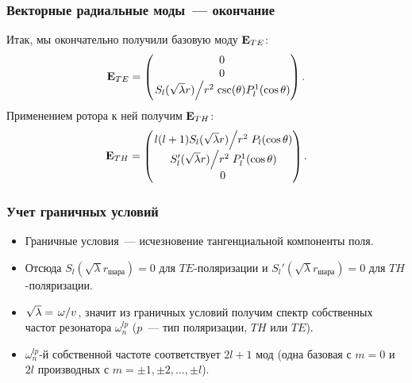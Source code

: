 \documentclass[compress]{beamer}
\begin{document}
    \begin{frame}\frametitle{Векторные радиальные моды~--- окончание}

        Итак, мы окончательно получили базовую моду $\vb{E}_{TE}$:
        \begin{equation*}
            \vb{E}_{TE} = \begin{pmatrix}
                0 \\ 0 \\ \flatfrac{S_l(\sqrt\lambda r)}{r^2} \csc(\theta) P^1_l(\cos\theta)
            \end{pmatrix} .
        \end{equation*}
        Применением ротора к ней получим $\vb{E}_{TH}$:
        \begin{equation*}
            \vb{E}_{TH} = \begin{pmatrix}
                \flatfrac{l(l+1) S_l(\sqrt\lambda r)}{r^2} P_l(\cos\theta) \\
                \flatfrac{S_l'(\sqrt\lambda r)}{r^2} P_l^1(\cos\theta) \\
                0
            \end{pmatrix} .
        \end{equation*}

    \end{frame}


    \begin{frame}\frametitle{Учет граничных условий}

        \begin{itemize}
            \item Граничные условия~--- исчезновение тангенциальной компоненты поля.

            \item Отсюда $S_l(\sqrt\lambda r_\text{шара}) = 0$ для $TE$-поляризации и $S_l'(\sqrt\lambda r_\text{шара}) = 0$ для $TH$-поляризации.

            \item $\sqrt\lambda = \flatfrac{\omega}{v}$, значит из граничных условий получим спектр собственных частот резонатора $\omega^{lp}_n$ ($p$~--- тип поляризации, $TH$ или $TE$).

            \item $\omega^{lp}_n$-й собственной частоте соответствует $2l + 1$ мод (одна базовая с $m = 0$ и $2l$ производных с $m = \pm 1, \pm 2, \dots, \pm l$).
        \end{itemize}

    \end{frame}
\end{document}
